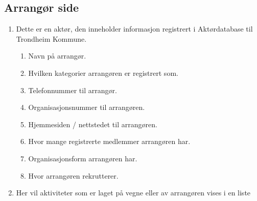 \subsection{Arrangør side}
\begin{center}
\end{center}
\begin{enumerate}
    \item Dette er en aktør, den inneholder informasjon registrert i Aktørdatabase til Trondheim Kommune. 
    \begin{enumerate}
        \item Navn på arrangør. 
        \item Hvilken kategorier arrangøren er registrert som. 
        \item Telefonnummer til arrangør.
        \item Organisasjonsnummer til arrangøren.
        \item Hjemmesiden / nettstedet til arrangøren.
        \item Hvor mange registrerte medlemmer arrangøren har. 
        \item Organisasjonsform arrangøren har.
        \item Hvor arrangøren rekrutterer.
    \end{enumerate}
    \item Her vil aktiviteter som er laget på vegne eller av arrangøren vises i en liste
\end{enumerate}




\clearpage